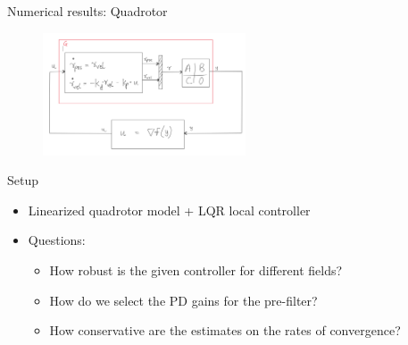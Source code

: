 \documentclass{beamer}
\begin{document}
\begin{frame}{Numerical results: Quadrotor}
	\begin{figure}[!htb]
			\includegraphics[width=6cm]{figures/Figure_IQC_paper.PNG}		
			\centering	
	\end{figure}
	\begin{block}{Setup}
		\begin{itemize}
			\item Linearized quadrotor model + LQR local controller
			\item Questions:
				  \begin{itemize}
				  	\item How robust is the given controller for different fields?
				  	\item How do we select the PD gains for the pre-filter?
				  	\item How conservative are the estimates on the rates of convergence?
			  	  \end{itemize}
		\end{itemize}
	\end{block}	
\end{frame}
\end{document}
